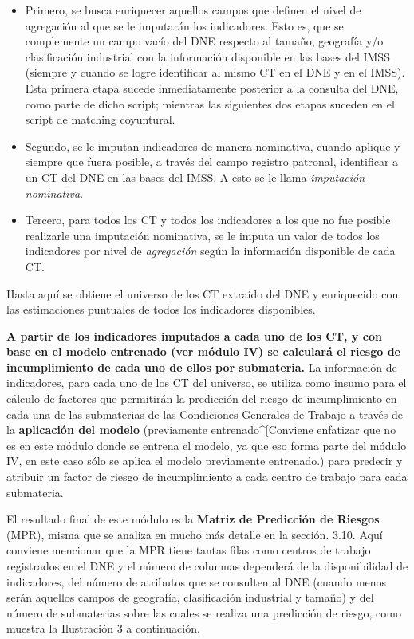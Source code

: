 \documentclass[
]{article}
\begin{document}
\begin{itemize}
\item
  Primero, se busca enriquecer aquellos campos que definen el nivel de agregación al que se le imputarán los indicadores. Esto es, que se complemente un campo vacío del DNE respecto al tamaño, geografía y/o clasificación industrial con la información disponible en las bases del IMSS (siempre y cuando se logre identificar al mismo CT en el DNE y en el IMSS). Esta primera etapa sucede inmediatamente posterior a la consulta del DNE, como parte de dicho script; mientras las siguientes dos etapas suceden en el script de matching coyuntural.
\item
  Segundo, se le imputan indicadores de manera nominativa, cuando aplique y siempre que fuera posible, a través del campo registro patronal, identificar a un CT del DNE en las bases del IMSS. A esto se le llama \emph{imputación nominativa}.
\item
  Tercero, para todos los CT y todos los indicadores a los que no fue posible realizarle una imputación nominativa, se le imputa un valor de todos los indicadores por nivel de \emph{agregación} según la información disponible de cada CT.
\end{itemize}

Hasta aquí se obtiene el universo de los CT extraído del DNE y enriquecido con las estimaciones puntuales de todos los indicadores disponibles.

\textbf{A partir de los indicadores imputados a cada uno de los CT, y con base en el modelo entrenado (ver módulo IV) se calculará el riesgo de incumplimiento de cada uno de ellos por submateria.} La información de indicadores, para cada uno de los CT del universo, se utiliza como insumo para el cálculo de factores que permitirán la predicción del riesgo de incumplimiento en cada una de las submaterias de las Condiciones Generales de Trabajo a través de la \textbf{aplicación del modelo} (previamente entrenado\^{}{[}Conviene enfatizar que no es en este módulo donde se entrena el modelo, ya que eso forma parte del módulo IV, en este caso sólo se aplica el modelo previamente entrenado.) para predecir y atribuir un factor de riesgo de incumplimiento a cada centro de trabajo para cada submateria.

El resultado final de este módulo es la \textbf{Matriz de Predicción de Riesgos} (MPR), misma que se analiza en mucho más detalle en la sección. 3.10. Aquí conviene mencionar que la MPR tiene tantas filas como centros de trabajo registrados en el DNE y el número de columnas dependerá de la disponibilidad de indicadores, del número de atributos que se consulten al DNE (cuando menos serán aquellos campos de geografía, clasificación industrial y tamaño) y del número de submaterias sobre las cuales se realiza una predicción de riesgo, como muestra la Ilustración 3 a continuación.
\end{document}
